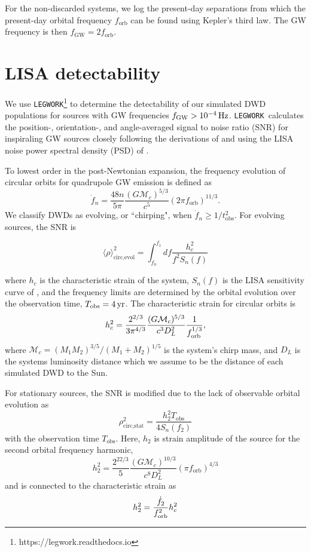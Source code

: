 \documentclass[twocolumn, linenumbers]{aastex631}
\newcommand{\legwork}{\texttt{LEGWORK}}
\begin{document}
For the non-discarded systems, we log the present-day separations from which the present-day orbital frequency $f_\text{orb}$ can be found using Kepler's third law. The GW frequency is then $f_\text{GW} = 2f_\text{orb}$.


\section{LISA detectability}
\label{sec:LISA_obs}
We use \legwork\footnote{https://legwork.readthedocs.io} \citep{Wagg2021} to determine the detectability of our simulated DWD populations for sources with GW frequencies $f_{\rm{GW}}>10^{-4}\,\rm{Hz}$. \legwork\ calculates the position-, orientation-, and angle-averaged signal to noise ratio (SNR) for inspiraling GW sources closely following the derivations of \citet{Flanagan1998} and using the LISA noise power spectral density (PSD) of \citet{Robson2019}. 

To lowest order in the post-Newtonian expansion, the frequency evolution of circular orbits for quadrupole GW emission is defined as
\begin{equation}
    \Dot{f}_n = \frac{48n}{5\pi} \frac{(G\mathcal{M}_c)^{5/3}}{c^5} (2\pi f_\text{orb})^{11/3}.
\end{equation}
We classify DWDs as evolving, or ``chirping", when $\Dot{f}_n \geq 1/t_\text{obs}^2$. For evolving sources, the SNR is

\begin{equation}
   \langle \rho \rangle^2_{\text{circ,evol}} = \int_{f_0}^{f_1}df   \frac{h_{c}^2}{f^2S_n(f)}
\end{equation}

\noindent where $h_c$ is the characteristic strain of the system, $S_n(f)$ is the LISA sensitivity curve of \citet{Robson2019}, and the frequency limits are determined by the orbital evolution over the observation time, $T_{\rm{obs}}=4\,\rm{yr}$. The characteristic strain for %
circular orbits is 
\begin{equation}
    h_{c}^2 = \frac{2^{2/3}}{3 \pi^{4/3}} \frac{(G \mathcal{M}_c)^{5/3}}{c^3 D_L^2} \frac{1}{f_{\rm orb}^{1/3}},
\end{equation}
\noindent where $\mathcal{M}_c = (M_1M_2)^{3/5}/(M_1 + M_2)^{1/5}$ is the system's chirp mass, and $D_L$ is the systems luminosity distance which we assume to be the distance of each simulated DWD to the Sun. 

For stationary sources, the SNR is modified due to the lack of observable orbital evolution as
\begin{equation}
    \rho_{\text{circ,stat}}^2 = \frac{h_{2}^2T_{\text{obs}}}{4 S_n(f_2)}
\end{equation}
with the observation time $T_{\text{obs}}$. Here, $h_2$ is strain amplitude of the source for the second orbital frequency harmonic,
\begin{equation}
   h_2^2 = \frac{2^{22/3}}{5}\frac{(G\mathcal{M}_c)^{10/3}}{c^8D_L^2}(\pi f_\text{orb})^{4/3}
\end{equation}
and is connected to the characteristic strain as
\begin{equation}
    h_2^2 = \frac{\dot{f}_{2}}{f_{\rm{orb}}^2} h_c^2
\end{equation}
\end{document}
